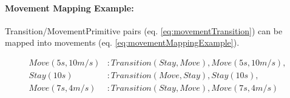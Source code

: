     \paragraph{Movement Mapping Example:} Transition/MovementPrimitive pairs (eq. \ref{eq:movementTransition}) can be mapped into movements (eq. \ref{eq:movementMappingExample}).
    
    \begin{equation}\label{eq:movementMappingExample}
    \begin{aligned}
        Move(5s,10m/s) &:Transition(Stay,Move), Move(5s,10m/s),\\
        Stay(10s) &: Transition(Move,Stay), Stay(10s),\\ 
        Move(7s,4m/s) &: Transition(Stay,Move), Move(7s,4m/s)
    \end{aligned}    
    \end{equation}

